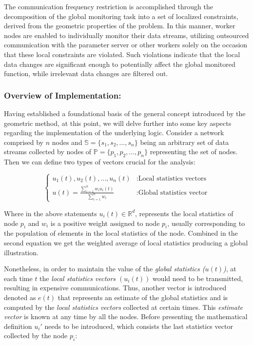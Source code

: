 The communication frequency restriction is accomplished through the decomposition of the global monitoring task into a set
of localized constraints, derived from the geometric properties of the problem. In this manner, worker nodes are enabled to
individually monitor their data streams, utilizing outsourced communication with the parameter server or other workers
solely on the occasion that these local constraints are violated. Such violations indicate that the local data changes
are significant enough to potentially affect the global monitored function, while irrelevant data changes are filtered out.

\subsubsection{Overview of Implementation:}
Having established a foundational basis of the general concept introduced by the geometric method, at this point, we will
delve further into some key aspects regarding the implementation of the underlying logic. Consider a network comprised
by $n$ nodes and $\mathbb{S} = \{s_1,s_2,\dots,s_n\}$ being an arbitrary set of data streams collected by nodes of $\mathbb{P}= \{p_1,p_2,\dots,p_n\}$
representing the set of nodes. Then we can define two types of vectors crucial for the analysis:

\begin{equation}
    \begin{cases}
        u_1(t),u_2(t),\dots,u_n(t)                               & : \text{Local statistics vectors} \\
        u(t)= \frac{\sum_{i=1}^{n}w_i u_i(t)}{\sum_{i=1}^{n}w_i} & : \text{Global statistics vector}
    \end{cases}
\end{equation}

\noindent
Where in the above statements $u_i(t) \in \mathbb{R}^d$, represents the local statistics of node $p_i$ and $w_i$ is a positive
weight assigned to node $p_i$, usually corresponding to the population of elements in the local statistics of the node. Combined
in the second equation we get the weighted average of local statistics producing a global illustration.

Nonetheless, in order to maintain the value of the \emph{global statistics ($u(t)$)}, at each time $t$ the \emph{local statistics vectors $(u_i(t))$}
would need to be transmitted, resulting in expensive communications. Thus, another vector is introduced denoted as $e(t)$ that represents an
estimate of the global statistics and is computed by the \emph{local statistics vectors} collected at certain times. This \emph{estimate vector}
is known at any time by all the nodes. Before presenting the mathematical definition $u_i'$ needs to be introduced, which consists
the last statistics vector collected by the node $p_i$:


